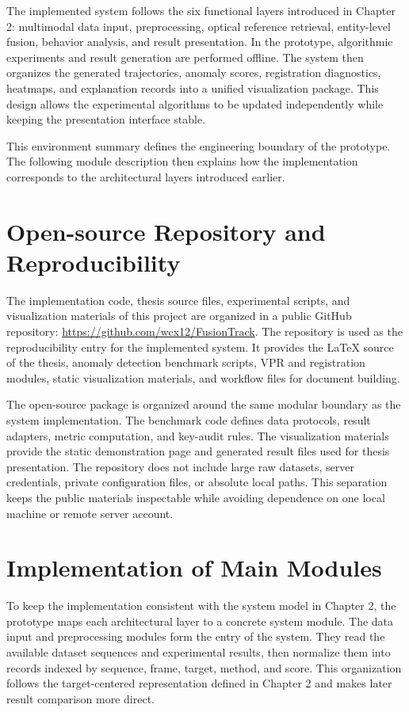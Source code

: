 The implemented system follows the six functional layers introduced in Chapter 2: multimodal data input, preprocessing, optical reference retrieval, entity-level fusion, behavior analysis, and result presentation. In the prototype, algorithmic experiments and result generation are performed offline. The system then organizes the generated trajectories, anomaly scores, registration diagnostics, heatmaps, and explanation records into a unified visualization package. This design allows the experimental algorithms to be updated independently while keeping the presentation interface stable.

This environment summary defines the engineering boundary of the prototype. The following module description then explains how the implementation corresponds to the architectural layers introduced earlier.

\section{Open-source Repository and Reproducibility}
The implementation code, thesis source files, experimental scripts, and visualization materials of this project are organized in a public GitHub repository: \url{https://github.com/wcx12/FusionTrack}. The repository is used as the reproducibility entry for the implemented system. It provides the LaTeX source of the thesis, anomaly detection benchmark scripts, VPR and registration modules, static visualization materials, and workflow files for document building.

The open-source package is organized around the same modular boundary as the system implementation. The benchmark code defines data protocols, result adapters, metric computation, and key-audit rules. The visualization materials provide the static demonstration page and generated result files used for thesis presentation. The repository does not include large raw datasets, server credentials, private configuration files, or absolute local paths. This separation keeps the public materials inspectable while avoiding dependence on one local machine or remote server account.

\section{Implementation of Main Modules}
To keep the implementation consistent with the system model in Chapter 2, the prototype maps each architectural layer to a concrete system module. The data input and preprocessing modules form the entry of the system. They read the available dataset sequences and experimental results, then normalize them into records indexed by sequence, frame, target, method, and score. This organization follows the target-centered representation defined in Chapter 2 and makes later result comparison more direct.

